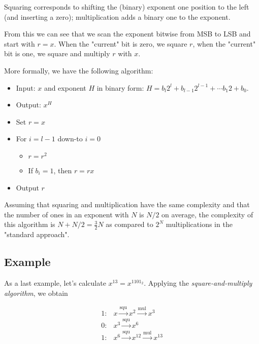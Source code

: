 Squaring corresponds to shifting the (binary) exponent one position to the left (and inserting a zero); multiplication adds a binary one to the exponent.

From this we can see that we scan the exponent bitwise from MSB to LSB and start with $r = x$. When the "current" bit is zero, we square $r$, when the "current" bit is one, we square and multiply $r$ with $x$.

More formally, we have the following algorithm:

\begin{itemize}
	\item Input: $x$ and exponent $H$ in binary form: $H = b_l 2^l + b_{l-1} 2^{l-1} + \cdots b_1 2 + b_0$.
	\item Output: $x^H$
	\item Set $r = x$
	\item For $i=l-1$ down-to $i=0$
	\begin{itemize}
		\item $r = r^2$
		\item If $b_i=1$, then $r = r x$
	\end{itemize}
	\item Output $r$
\end{itemize}

Assuming that squaring and multiplication have the same complexity and that the number of ones in an exponent with $N$ is $N/2$ on average, the complexity of this algorithm is $N + N/2 = \frac{3}{2}N$ as compared to $2^N$ multiplications in the "standard approach".

\subsection{Example}

As a last example, let's calculate $x^{13} = x^{1101_2}$. Applying the \emph{square-and-multiply algorithm}, we obtain

\begin{align*}
1: & x \xrightarrow{\text{squ}} x^2 \xrightarrow{\text{mul}} x^3 \\
0: & x^3 \xrightarrow{\text{squ}} x^6 \\
1: & x^6 \xrightarrow{\text{squ}} x^{12} \xrightarrow{\text{mul}} x^{13}
\end{align*}



